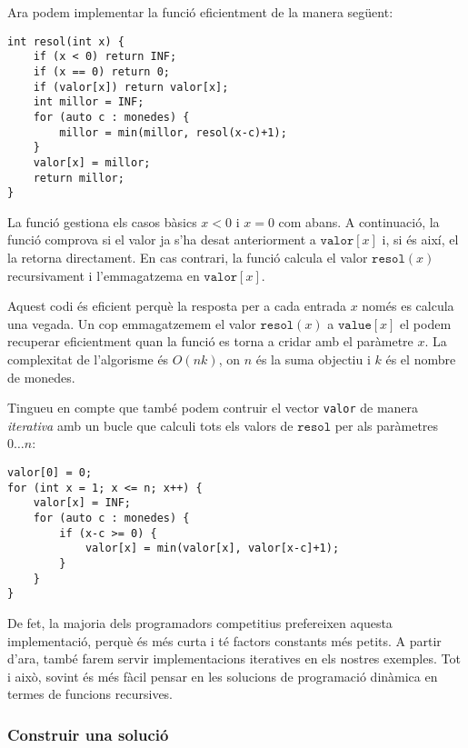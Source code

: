 Ara podem implementar la funció eficientment
de la manera següent:
\begin{lstlisting}
int resol(int x) {
    if (x < 0) return INF;
    if (x == 0) return 0;
    if (valor[x]) return valor[x];
    int millor = INF;
    for (auto c : monedes) {
        millor = min(millor, resol(x-c)+1);
    }
    valor[x] = millor;
    return millor;
}
\end{lstlisting}

La funció gestiona els casos bàsics
$x<0$ i $x=0$ com abans.
A continuació, la funció comprova si
el valor ja s'ha desat anteriorment a $\texttt{valor}[x]$
i, si és així, el la retorna directament.
En cas contrari, la funció calcula el valor
$\texttt{resol}(x)$ recursivament i
l'emmagatzema en $\texttt{valor}[x]$.

Aquest codi és eficient perquè la resposta
per a cada entrada $x$
només es calcula una vegada.
Un cop emmagatzemem el valor $\texttt{resol}(x)$ a $\texttt{value}[x]$
el podem recuperar eficientment quan la
funció es torna a cridar amb el paràmetre $x$.
La complexitat de l'algorisme és $O(nk)$,
on $n$ és la suma objectiu i $k$ és el nombre de monedes.

Tingueu en compte que també podem contruir el
vector \texttt{valor} de manera \emph{iterativa} amb un
bucle que calculi tots els valors
de $\texttt{resol}$ per als paràmetres $0 \ldots n$:
\begin{lstlisting}
valor[0] = 0;
for (int x = 1; x <= n; x++) {
    valor[x] = INF;
    for (auto c : monedes) {
        if (x-c >= 0) {
            valor[x] = min(valor[x], valor[x-c]+1);
        }
    }
}
\end{lstlisting}

De fet, la majoria dels programadors competitius prefereixen
aquesta implementació, perquè és més curta i té
factors constants més petits.
A partir d'ara, també farem servir implementacions iteratives
en els nostres exemples.
Tot i això, sovint és més fàcil pensar
en les solucions de programació dinàmica
en termes de funcions recursives.


\subsubsection{Construir una solució}

